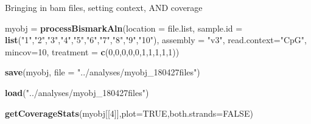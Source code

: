 \documentclass[]{article}
\newenvironment{Shaded}{\begin{snugshade}}{\end{snugshade}}
\newcommand{\KeywordTok}[1]{\textcolor[rgb]{0.13,0.29,0.53}{\textbf{#1}}}
\newcommand{\DataTypeTok}[1]{\textcolor[rgb]{0.13,0.29,0.53}{#1}}
\newcommand{\DecValTok}[1]{\textcolor[rgb]{0.00,0.00,0.81}{#1}}
\newcommand{\StringTok}[1]{\textcolor[rgb]{0.31,0.60,0.02}{#1}}
\newcommand{\OtherTok}[1]{\textcolor[rgb]{0.56,0.35,0.01}{#1}}
\newcommand{\NormalTok}[1]{#1}
\begin{document}
Bringing in bam files, setting context, AND coverage

\begin{Shaded}
\begin{Highlighting}[]
\NormalTok{myobj =}\StringTok{ }\KeywordTok{processBismarkAln}\NormalTok{(}\DataTypeTok{location =}\NormalTok{ file.list, }\DataTypeTok{sample.id =} \KeywordTok{list}\NormalTok{(}\StringTok{"1"}\NormalTok{,}\StringTok{"2"}\NormalTok{,}\StringTok{"3"}\NormalTok{,}\StringTok{"4"}\NormalTok{,}\StringTok{"5"}\NormalTok{,}\StringTok{"6"}\NormalTok{,}\StringTok{"7"}\NormalTok{,}\StringTok{"8"}\NormalTok{,}\StringTok{"9"}\NormalTok{,}\StringTok{"10"}\NormalTok{), }\DataTypeTok{assembly =} \StringTok{"v3"}\NormalTok{, }\DataTypeTok{read.context=}\StringTok{"CpG"}\NormalTok{, }\DataTypeTok{mincov=}\DecValTok{10}\NormalTok{, }\DataTypeTok{treatment =} \KeywordTok{c}\NormalTok{(}\DecValTok{0}\NormalTok{,}\DecValTok{0}\NormalTok{,}\DecValTok{0}\NormalTok{,}\DecValTok{0}\NormalTok{,}\DecValTok{0}\NormalTok{,}\DecValTok{1}\NormalTok{,}\DecValTok{1}\NormalTok{,}\DecValTok{1}\NormalTok{,}\DecValTok{1}\NormalTok{,}\DecValTok{1}\NormalTok{))}
\end{Highlighting}
\end{Shaded}

\begin{Shaded}
\begin{Highlighting}[]
\KeywordTok{save}\NormalTok{(myobj, }\DataTypeTok{file =} \StringTok{"../analyses/myobj_180427files"}\NormalTok{)}
\end{Highlighting}
\end{Shaded}

\begin{Shaded}
\begin{Highlighting}[]
\KeywordTok{load}\NormalTok{(}\StringTok{"../analyses/myobj_180427files"}\NormalTok{)}
\end{Highlighting}
\end{Shaded}

\begin{Shaded}
\begin{Highlighting}[]
\KeywordTok{getCoverageStats}\NormalTok{(myobj[[}\DecValTok{4}\NormalTok{]],}\DataTypeTok{plot=}\OtherTok{TRUE}\NormalTok{,}\DataTypeTok{both.strands=}\OtherTok{FALSE}\NormalTok{)}
\end{Highlighting}
\end{Shaded}
\end{document}

